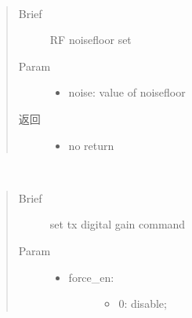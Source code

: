 \documentclass[letterpaper,10pt,english]{sphinxhowto}
\begin{document}
\begin{fulllineitems}
\begin{fulllineitems}
\end{fulllineitems}


\begin{fulllineitems}
\label{\detokenize{rfapi/index:wifi_api.WIFIAPI.set_noise_floor}}~\begin{quote}\begin{description}
\item[{Brief}] \leavevmode
RF noisefloor set

\item[{Param}] \leavevmode\begin{itemize}
\item {} 
noise:  value of noisefloor

\end{itemize}

\item[{返回}] \leavevmode
\begin{itemize}
\item {} 
no return

\end{itemize}


\end{description}\end{quote}

\end{fulllineitems}


\begin{fulllineitems}
\label{\detokenize{rfapi/index:wifi_api.WIFIAPI.set_tx_dig_gain}}~\begin{quote}\begin{description}
\item[{Brief}] \leavevmode
set tx digital gain command

\item[{Param}] \leavevmode\begin{itemize}
\item {} \begin{description}
\item[{force\_en:}] \leavevmode\begin{itemize}
\item {} 
0: disable;


\end{itemize}
\end{description}
\end{itemize}
\end{description}
\end{quote}
\end{fulllineitems}
\end{fulllineitems}
\end{document}
